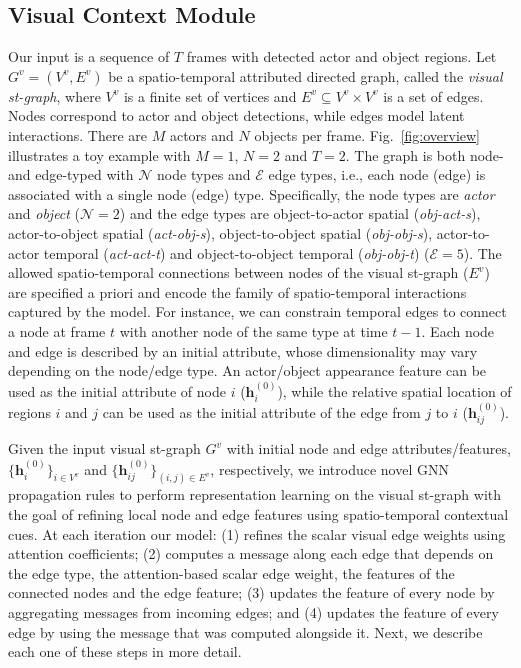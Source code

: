 \documentclass[runningheads]{llncs}
\newcommand{\h}{\mathbf{h}}
\begin{document}
\subsection{Visual Context Module}
\label{subsec:visual_context}
 Our 
input is a sequence of $T$ frames with detected actor and object regions. Let $G^v = (V^v, 
E^v)$ be a spatio-temporal attributed directed 
graph, called the 
\emph{visual st-graph}, where $V^v$ is a finite set 
of vertices and $E^v 
\subseteq V^v \times V^v$ is a set of edges. Nodes correspond to actor and object detections, while edges model latent interactions. There are $M$ actors and $N$ objects per frame. Fig.~\ref{fig:overview} illustrates a toy example with $M=1$, $N=2$ and $T=2$.
The graph is both node- and edge-typed
with $\mathcal{N}$ node types and $\mathcal{E}$ edge types, i.e., each node (edge) is associated with a single node (edge) type. Specifically, the node types are
\emph{actor} and \emph{object} ($\mathcal{N}=2$) and the edge types are object-to-actor spatial (\emph{obj-act-s}), actor-to-object spatial (\emph{act-obj-s}), object-to-object spatial (\emph{obj-obj-s}), actor-to-actor temporal (\emph{act-act-t}) and object-to-object temporal (\emph{obj-obj-t})  ($\mathcal{E}=5$). The allowed spatio-temporal connections between nodes of the visual st-graph ($E^v$) are specified a priori and encode the family of spatio-temporal interactions captured by the model. For instance, we can constrain temporal edges to connect a node 
at frame $t$ with another node of the same type at time $t-1$.
Each node and edge is described by an initial attribute, whose dimensionality may vary depending on the node/edge type. An actor/object appearance feature can be used as the initial attribute of node $i$ ($\h^{(0)}
_i$), while the relative spatial location of regions $i$ and $j$ can be used as the initial attribute of the edge from $j$ to $i$ ($\h^{(0)}
_{ij}$).


Given the input visual st-graph $G^v$ with initial node and edge attributes/features, $\{\h_{i}
^{(0)}\}_{i \in V^v}$ and $\{\h_{ij}^{(0)}\}_{(i, j) \in E^v}$,
respectively, we introduce novel GNN propagation rules to perform representation learning on the visual st-graph with the goal of refining local node and edge features using spatio-temporal contextual cues.
At each iteration our model: (1) refines the scalar visual edge weights using attention coefficients;
(2) computes a message along each edge that depends on the edge type, the attention-based  scalar edge weight, the features of the connected nodes and the edge feature; (3) updates the feature of every node by aggregating messages from incoming edges; and (4) updates the feature of every edge by using the message that was computed alongside it. Next, we describe each one of these steps in more detail.
\end{document}
